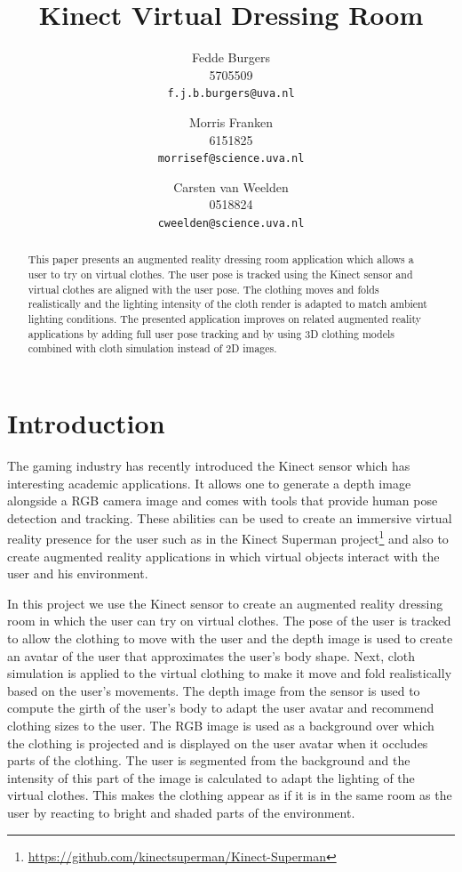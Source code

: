 \documentclass[twocolumn,a4paper]{article}
\title{Kinect Virtual Dressing Room}
\author{Fedde Burgers \\ 5705509 \\ \texttt{f.j.b.burgers@uva.nl} \and Morris Franken \\ 6151825 \\ \texttt{morrisef@science.uva.nl} \and Carsten van Weelden \\ 0518824 \\ \texttt{cweelden@science.uva.nl}}
\begin{document}
\maketitle

\begin{abstract}
\small{This paper presents an augmented reality dressing room application which allows a user to try on virtual clothes. The user pose is tracked using the Kinect sensor and virtual clothes are aligned with the user pose. The clothing moves and folds realistically and the lighting intensity of the cloth render is adapted to match ambient lighting conditions. The presented application improves on related augmented reality applications by adding full user pose tracking and by using 3D clothing models combined with cloth simulation instead of 2D images. }

\par{}
\end{abstract}

\section{Introduction}
\label{sec:introduction}

The gaming industry has recently introduced the Kinect sensor which has interesting academic applications. It allows one to generate a depth image alongside a RGB camera image and comes with tools that provide human pose detection and tracking. These abilities can be used to create an immersive virtual reality presence for the user such as in the Kinect Superman project\footnote{\url{https://github.com/kinectsuperman/Kinect-Superman}} and also to create augmented reality applications in which virtual objects interact with the user and his environment.

In this project we use the Kinect sensor to create an augmented reality dressing room in which the user can try on virtual clothes. The pose of the user is tracked to allow the clothing to move with the user and the depth image is used to create an avatar of the user that approximates the user's body shape. Next, cloth simulation is applied to the virtual clothing to make it move and fold realistically based on the user's movements. The depth image from the sensor is used to compute the girth of the user's body to adapt the user avatar and recommend clothing sizes to the user. The RGB image is used as a background over which the clothing is projected and is displayed on the user avatar when it occludes parts of the clothing. The user is segmented from the background and the intensity of this part of the image is calculated to adapt the lighting of the virtual clothes. This makes the clothing appear as if it is in the same room as the user by reacting to bright and shaded parts of the environment.
\end{document}
